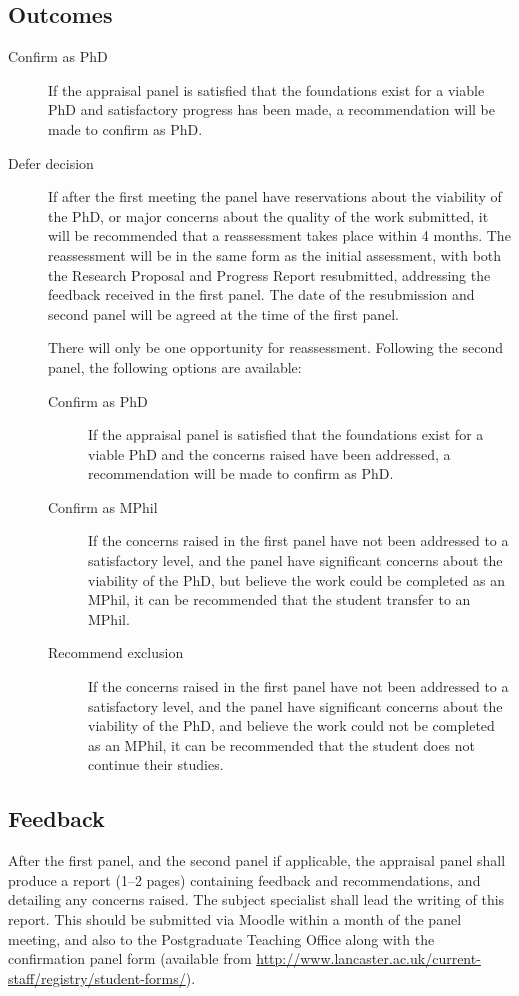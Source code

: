 \documentclass[12pt,a4paper]{article}
\begin{document}
\subsection{Outcomes}

\begin{description}
	\item[Confirm as PhD] If the appraisal panel is satisfied that the foundations exist for a viable PhD and satisfactory progress has been made, a recommendation will be made to confirm as PhD.
	\item[Defer decision] If after the first meeting the panel have reservations about the viability of the PhD, or major concerns about the quality of the work submitted, it will be recommended that a reassessment takes place within 4 months. The reassessment will be in the same form as the initial assessment, with both the Research Proposal and Progress Report resubmitted, addressing the feedback received in the first panel. The date of the resubmission and second panel will be agreed at the time of the first panel.
	
	There will only be one opportunity for reassessment. Following the second panel, the following options are available:
	\begin{description}
		\item[Confirm as PhD] If the appraisal panel is satisfied that the foundations exist for a viable PhD and the concerns raised have been addressed, a recommendation will be made to confirm as PhD.
		\item[Confirm as MPhil] If the concerns raised in the first panel have not been addressed to a satisfactory level, and the panel have significant concerns about the viability of the PhD, but believe the work could be completed as an MPhil, it can be recommended that the student transfer to an MPhil.
		\item[Recommend exclusion] If the concerns raised in the first panel have not been addressed to a satisfactory level, and the panel have significant concerns about the viability of the PhD, and believe the work could not be completed as an MPhil, it can be recommended that the student does not continue their studies.
	\end{description}
\end{description}

\subsection{Feedback}
After the first panel, and the second panel if applicable, the appraisal panel shall produce a report (1--2 pages) containing feedback and recommendations, and detailing any concerns raised. The subject specialist shall lead the writing of this report. This should be submitted via Moodle within a month of the panel meeting, and also to the Postgraduate Teaching Office along with the confirmation panel form (available from \url{http://www.lancaster.ac.uk/current-staff/registry/student-forms/}).
\end{document}
